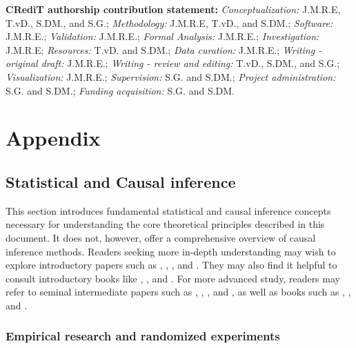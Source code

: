 \documentclass[
  authoryear,
  review,
  1p]{elsarticle}
\begin{document}
\textbf{CRediT authorship contribution statement:}
\emph{Conceptualization:} J.M.R.E, T.vD., S.DM., and S.G.;
\emph{Methodology:} J.M.R.E, T.vD., and S.DM.; \emph{Software:}
J.M.R.E.; \emph{Validation:} J.M.R.E.; \emph{Formal Analysis:} J.M.R.E.;
\emph{Investigation:} J.M.R.E; \emph{Resources:} T.vD. and S.DM.;
\emph{Data curation:} J.M.R.E.; \emph{Writing - original draft:}
J.M.R.E.; \emph{Writing - review and editing:} T.vD., S.DM., and S.G.;
\emph{Visualization:} J.M.R.E.; \emph{Supervision:} S.G. and S.DM.;
\emph{Project administration:} S.G. and S.DM.; \emph{Funding
acquisition:} S.G. and S.DM.

\newpage{}

\section{Appendix}\label{sec-appendix}

\subsection{Statistical and Causal inference}\label{sec-appendixB}

This section introduces fundamental statistical and causal inference
concepts necessary for understanding the core theoretical principles
described in this document. It does not, however, offer a comprehensive
overview of causal inference methods. Readers seeking more in-depth
understanding may wish to explore introductory papers such as
\citet{Pearl_2010}, \citet{Rohrer_2018}, \citet{Pearl_2019}, and
\citet{Cinelli_et_al_2020}. They may also find it helpful to consult
introductory books like \citet{Pearl_et_al_2018}, \citet{Neal_2020}, and
\citet{McElreath_2020}. For more advanced study, readers may refer to
seminal intermediate papers such as \citet{Neyman_et_al_1923},
\citet{Rubin_1974}, \citet{Spirtes_et_al_1991}, and \citet{Sekhon_2009},
as well as books such as \citet{Pearl_2009}, \citet{Morgan_et_al_2014},
and \citet{Hernan_et_al_2020}.

\subsubsection{Empirical research and randomized
experiments}\label{sec-appendixB1}
\end{document}
